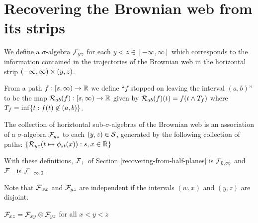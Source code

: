 {
\section{Recovering the Brownian web from its strips}


We define a $\sigma$-algebra $\mathcal{F}_{y z}$ for each $y < z \in
[-\infty, \infty]$ which corresponds to the information contained in
the trajectories of the Brownian web in the horizontal strip
$(-\infty, \infty) \times (y,z)$.

\newcommand{\brownianwebnoise}{collection of horiztontal
  sub-$\sigma$-algebras of the Brownian web}

\begin{definition}
  \newcommand{\T}{\stripleavetime{f}}
  \label{def:restrict}
  From a path $f : [s, \infty) \to \mathbb{R}$ we define ``$f$ stopped on
    leaving the interval $(a,b)$'' to be the map $\mathcal{R}_{{a}{b}}(f) : [s,
      \infty) \to \mathbb{R}$ given by $\restrict{a}{b}{f}(t) = f(t \minsym \T)$
      where $\T = \inf\{ t : f(t) \not\in (a,b) \}$.

  \label{def:horizontal-factorization}
  The \brownianwebnoise{} is an
  association of a $\sigma$-algebra $\mathcal{F}_{y z}$ to each $(y, z)
  \in \mathcal{S}$, generated by the following collection of paths:
  $\{ \mathcal{R}_{{y}{z}}(t \mapsto \phi_{{s}{t}}(x)) : s, x \in \mathbb{R} \}$
\end{definition}


With these definitions, $\mathcal{F}_{+}$ of Section \ref{recovering-from-half-planes} is
$\mathcal{F}_{0,\infty}$ and $\mathcal{F}_{-}$ is
$\mathcal{F}_{-\infty,0}$.

\begin{observation}
  Note that $\mathcal{F}_{w x}$ and $\mathcal{F}_{y z}$ are independent if the
  intervals $(w,x)$ and $(y,z)$ are disjoint.
\end{observation}

\renewcommand{\top}{b}
\newcommand{\bottom}{a}

\begin{theorem}\label{thm:recoveringfromstrips}
  $\mathcal{F}_{x z} = \mathcal{F}_{x y} \otimes \mathcal{F}_{y z}$ for all $x < y < z$
\end{theorem}

}
